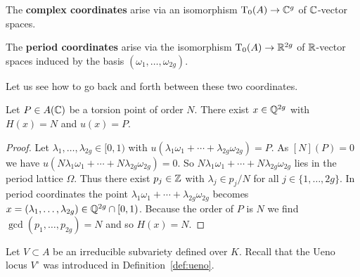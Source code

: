 
\bigskip
\noindent The \textbf{complex coordinates} arise via an isomorphism
$\mathrm{T}_0(A)\rightarrow{\mathbb{C}}^g$ of ${\mathbb{C}}$-vector spaces. 



\bigskip
\noindent The \textbf{period coordinates} arise via the isomorphism
$\mathrm{T}_0(A)\rightarrow {\mathbb{R}}^{2g}$ of ${\mathbb{R}}$-vector spaces
induced by the basis $(\omega_1,\ldots,\omega_{2g})$. 

Let us see how to go back and forth between these two coordinates.

\begin{lemma}
  \label{lem:rationalpreimage}
  Let $P\in A({\mathbb{C}})$ be a torsion point of order $N$.
  There exist $x\in {\mathbb{Q}}^{2g}$ with $H(x)=N$ and $u(x)=P$. 
\end{lemma}
\begin{proof}
  Let $\lambda_1,\ldots,\lambda_{2g}\in [0,1)$ with
  $u(\lambda_1\omega_1+\cdots+\lambda_{2g}\omega_{2g}) = P$.
  As $[N](P)=0$ we have
  $u(N\lambda_1\omega_1+\cdots +N\lambda_{2g}\omega_{2g})=0$.
  So $N\lambda_1\omega_1+\cdots +N\lambda_{2g}\omega_{2g}$ lies in the
  period lattice $\Omega$. Thus there exist $p_j\in {\mathbb{Z}}$ with
  $\lambda_j\in p_j/N$ for all $j\in\{1,\ldots,2g\}$.
  In period coordinates the point
  $\lambda_1\omega_1+\cdots+\lambda_{2g}\omega_{2g}$ becomes
  $x=(\lambda_1,\ldots,\lambda_{2g})\in {\mathbb{Q}}^{2g}\cap [0,1)$.
  Because the order of $P$ is $N$ we find $\gcd(p_1,\ldots,p_{2g})=N$
  and so $H(x)=N$. 
\end{proof}


Let $V\subset A$ be an irreducible subvariety defined over $K$. Recall
that the Ueno locus $V^{\circ}$ was introduced  in Definition~\ref{def:ueno}.

